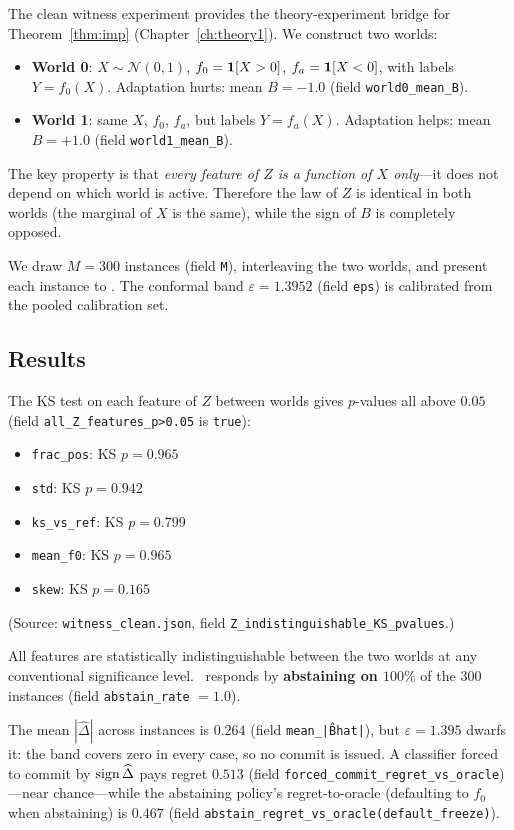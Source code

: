 The clean witness experiment provides the theory-experiment bridge for
Theorem~\ref{thm:imp} (Chapter~\ref{ch:theory1}).  We construct two worlds:
\begin{itemize}
  \item \textbf{World 0}: $X \sim \mathcal{N}(0,1)$, $f_0 = \mathbf{1}[X > 0]$,
    $f_a = \mathbf{1}[X < 0]$, with labels $Y = f_0(X)$.  Adaptation hurts: mean $B = -1.0$
    (field \texttt{world0\_mean\_B}).
  \item \textbf{World 1}: same $X$, $f_0$, $f_a$, but labels $Y = f_a(X)$.  Adaptation
    helps: mean $B = +1.0$ (field \texttt{world1\_mean\_B}).
\end{itemize}
The key property is that \emph{every feature of $Z$ is a function of $X$ only}---it does
not depend on which world is active.  Therefore the law of $Z$ is identical in both
worlds (the marginal of $X$ is the same), while the sign of $B$ is completely opposed.

We draw $M = 300$ instances (field \texttt{M}), interleaving the two worlds, and present
each instance to \KGA.  The conformal band $\varepsilon = 1.3952$ (field \texttt{eps}) is
calibrated from the pooled calibration set.

\subsection{Results}

The KS test on each feature of $Z$ between worlds gives $p$-values all above $0.05$
(field \texttt{all\_Z\_features\_p>0.05} is \texttt{true}):

\begin{itemize}
  \item \texttt{frac\_pos}: KS $p = 0.965$
  \item \texttt{std}: KS $p = 0.942$
  \item \texttt{ks\_vs\_ref}: KS $p = 0.799$
  \item \texttt{mean\_f0}: KS $p = 0.965$
  \item \texttt{skew}: KS $p = 0.165$
\end{itemize}
(Source: \texttt{witness\_clean.json}, field
\texttt{Z\_indistinguishable\_KS\_pvalues}.)

All features are statistically indistinguishable between the two worlds at any conventional
significance level.  \KGA\ responds by \textbf{abstaining on $100\%$} of the 300 instances
(field \texttt{abstain\_rate} $= 1.0$).

The mean $|\widehat\Delta|$ across instances is $0.264$ (field
\texttt{mean\_|\^Bhat|}), but $\varepsilon = 1.395$ dwarfs it: the band covers zero in
every case, so no commit is issued.  A classifier forced to commit by
$\operatorname{sign}\widehat\Delta$ pays regret $0.513$ (field
\texttt{forced\_commit\_regret\_vs\_oracle})---near chance---while the abstaining policy's
regret-to-oracle (defaulting to $f_0$ when abstaining) is $0.467$ (field
\texttt{abstain\_regret\_vs\_oracle(default\_freeze)}).

